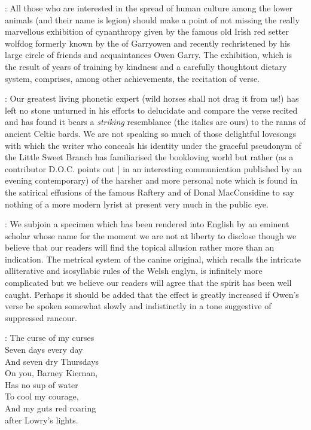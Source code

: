:
All those who are interested in the spread of human culture among
the lower animals (and their name is legion) should make a point of not
missing the really marvellous exhibition of cynanthropy given by the
famous old Irish red setter wolfdog formerly known by the  of
Garryowen and recently rechristened by his large circle of friends and
acquaintances Owen Garry.
The exhibition,
which is the result of years of
training by kindness and a carefully thoughtout dietary system,
comprises,
among other achievements,
the recitation of verse.

:
Our greatest living
phonetic expert
(wild horses shall not drag it from us!) has left no stone
unturned in his efforts to delucidate and compare the verse recited and has
found it bears a \emph{striking} resemblance (the italics are ours) to the ranns
of ancient Celtic bards.
We are not speaking so much of those delightful
lovesongs with which the writer who conceals his identity under the
graceful pseudonym of the Little Sweet Branch has familiarised the
bookloving world but rather
(as a contributor D.O.C. points out |
in an interesting communication published by an evening contemporary)
of the harsher and more personal note which is found in the satirical effusions
of the famous Raftery and of Donal MacConsidine to say nothing of a more
modern lyrist at present very much in the public eye.%

:
We subjoin a
specimen which has been rendered into English by an eminent scholar
whose name for the moment we are not at liberty to disclose though
we believe that our readers will find the topical allusion rather
more than an indication.
The metrical system of the canine original,
which recalls the intricate alliterative and isosyllabic rules of
the Welsh englyn,
is infinitely more complicated but we believe our
readers will agree that the spirit has been well caught.
Perhaps
it should be added that the effect is greatly increased if Owen's
verse be spoken somewhat slowly and indistinctly in a tone suggestive
of suppressed rancour.

\garryowen:
    The curse
       of my curses\\
    Seven days every day\\
    And seven dry Thursdays\\
    On you,
Barney Kiernan,\\
    Has no sup of water\\
    To cool my courage,\\
    And my guts red roaring\\
    after Lowry's lights.

